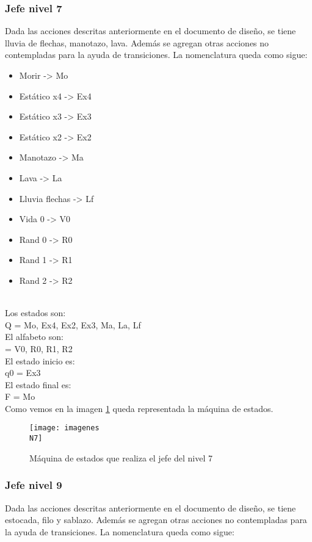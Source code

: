 \subsubsection{Jefe nivel 7}
Dada las acciones descritas anteriormente en el documento de diseño, se tiene lluvia de flechas, manotazo, lava. Además se agregan otras acciones no contempladas para la ayuda de transiciones.
La nomenclatura queda como sigue:
\\[1pt]

\begin{itemize}
	\item Morir -> Mo
	\item Estático x4 -> Ex4
	\item Estático x3 -> Ex3
	\item Estático x2 -> Ex2
	\item Manotazo -> Ma
	\item Lava -> La
	\item Lluvia flechas -> Lf
	\item Vida 0 -> V0
	\item Rand 0 -> R0
	\item Rand 1 -> R1
	\item Rand 2 -> R2
\end{itemize}
\\[1pt]

Los estados son:
\\[1pt]
Q = {Mo, Ex4, Ex2, Ex3, Ma, La, Lf}
\\[1pt]

El alfabeto son:
\\[1pt]
\sigma = {V0, R0, R1, R2}
\\[1pt]

El estado inicio es:
\\[1pt]
q0 = {Ex3}
\\[1pt]

El estado final es:
\\[1pt]
F = {Mo}
\\[1pt]


Como vemos en la imagen \ref{fig:maqN7} queda representada la máquina de estados.

\begin{figure}
	\centering
	\caption{Máquina de estados que realiza el jefe del nivel 7}
	\label{fig:maqN7}
	\texttt{[image: imagenes\\N7]}
\end{figure}

\subsubsection{Jefe nivel 9}
Dada las acciones descritas anteriormente en el documento de diseño, se tiene estocada, filo y sablazo. Además se agregan otras acciones no contempladas para la ayuda de transiciones.
La nomenclatura queda como sigue:
\\[1pt]

